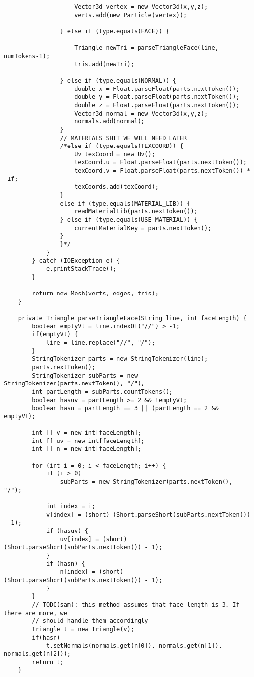 \begin{lstlisting}
					Vector3d vertex = new Vector3d(x,y,z);
					verts.add(new Particle(vertex));
					
				} else if (type.equals(FACE)) {
					
					Triangle newTri = parseTriangleFace(line, numTokens-1);
					tris.add(newTri);
					
				} else if (type.equals(NORMAL)) {
					double x = Float.parseFloat(parts.nextToken());
					double y = Float.parseFloat(parts.nextToken());
					double z = Float.parseFloat(parts.nextToken());
					Vector3d normal = new Vector3d(x,y,z);
					normals.add(normal);
				}  
				// MATERIALS SHIT WE WILL NEED LATER
				/*else if (type.equals(TEXCOORD)) {
					Uv texCoord = new Uv();
					texCoord.u = Float.parseFloat(parts.nextToken());
					texCoord.v = Float.parseFloat(parts.nextToken()) * -1f;
					texCoords.add(texCoord);
				}
				else if (type.equals(MATERIAL_LIB)) {
					readMaterialLib(parts.nextToken());
				} else if (type.equals(USE_MATERIAL)) {
					currentMaterialKey = parts.nextToken();
				}
				}*/
			}
		} catch (IOException e) {
			e.printStackTrace();
		}

		return new Mesh(verts, edges, tris);
	}

	private Triangle parseTriangleFace(String line, int faceLength) {
		boolean emptyVt = line.indexOf("//") > -1;
		if(emptyVt) {
			line = line.replace("//", "/");
		}
		StringTokenizer parts = new StringTokenizer(line);
		parts.nextToken();
		StringTokenizer subParts = new StringTokenizer(parts.nextToken(), "/");
		int partLength = subParts.countTokens();
		boolean hasuv = partLength >= 2 && !emptyVt;
		boolean hasn = partLength == 3 || (partLength == 2 && emptyVt);
		
		int [] v = new int[faceLength];
		int [] uv = new int[faceLength];
		int [] n = new int[faceLength];
		
		for (int i = 0; i < faceLength; i++) {
			if (i > 0)
				subParts = new StringTokenizer(parts.nextToken(), "/");
			
			int index = i;
			v[index] = (short) (Short.parseShort(subParts.nextToken()) - 1);
			if (hasuv) {
				uv[index] = (short) (Short.parseShort(subParts.nextToken()) - 1);
			}
			if (hasn) {
				n[index] = (short) (Short.parseShort(subParts.nextToken()) - 1);
			}
		}
		// TODO(sam): this method assumes that face length is 3. If there are more, we 
		// should handle them accordingly
		Triangle t = new Triangle(v);
		if(hasn)
			t.setNormals(normals.get(n[0]), normals.get(n[1]), normals.get(n[2]));
		return t;
	}
	

\end{lstlisting}
